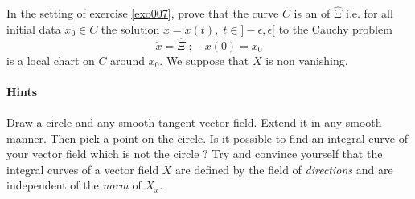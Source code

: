 \begin{exercice}\label{exo008}

In the setting of exercise \ref{exo007}, prove that the curve $C$ is an 
of $\hat{\Xi}$ i.e. for all initial data $x_0\in C$ the solution $x=x(t),\;t\in]-\epsilon,\epsilon[$ to the Cauchy problem
\[ 
 \dot{x}=\hat{\Xi}\;;\quad x(0)=x_0 
\]
is a local chart on $C$ around $x_0$. We suppose that $X$ is non vanishing.


\paragraph{Hints} Draw a circle and any smooth tangent vector field. Extend it in any smooth manner. Then pick a point on the circle. Is it possible to find an integral curve of your vector field which is not the circle ? Try and convince yourself that the integral curves of a vector field $X$ are defined by the field of \emph{directions} and are independent of the \emph{norm} of $X_x$.


\end{exercice}

